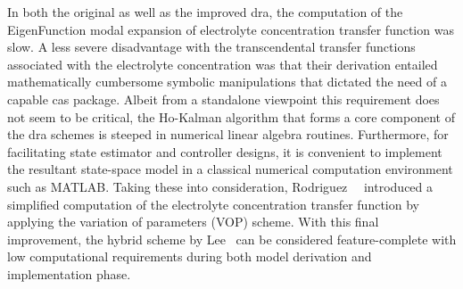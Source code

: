 In both the original  as well as the improved \gls{dra},  the computation of the
EigenFunction modal expansion of electrolyte concentration transfer function was
slow.  A less  severe disadvantage  with the  transcendental transfer  functions
associated with the electrolyte concentration was that their derivation entailed
mathematically cumbersome  symbolic manipulations  that dictated  the need  of a
capable \gls{cas} package.  Albeit from a standalone  viewpoint this requirement
does  not  seem to  be  critical,  the Ho-Kalman  algorithm  that  forms a  core
component  of the  \gls{dra}  schemes  is steeped  in  numerical linear  algebra
routines. Furthermore, for facilitating  state estimator and controller designs,
it is  convenient to implement  the resultant  state-space model in  a classical
numerical  computation environment  such as  \textsc{MATLAB}. Taking  these into
consideration,  Rodriguez~\etal{}~\cite{Rodriguez2017}  introduced a  simplified
computation of the  electrolyte concentration transfer function  by applying the
variation of  parameters (VOP) scheme.  With this final improvement,  the hybrid
scheme by Lee~\etal{}  can be considered feature-complete  with low computational
requirements during both model derivation and implementation phase.

